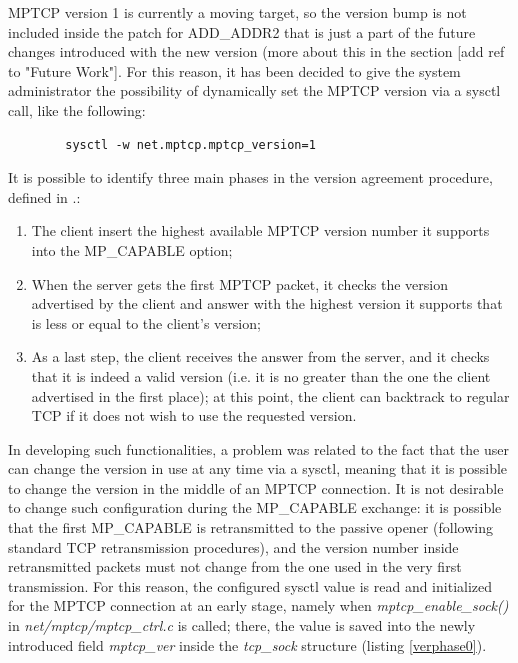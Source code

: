 MPTCP version 1 is currently a moving target, so the version bump is not included inside the patch for ADD\_ADDR2 that is just a part of the future changes introduced with the new version (more about this in the section [add ref to "Future Work"]. For this reason, it has been decided to give the system administrator the possibility of dynamically set the MPTCP version via a sysctl call, like the following:

\begin{verbatim}
        sysctl -w net.mptcp.mptcp_version=1
\end{verbatim}

It is possible to identify three main phases in the version agreement procedure, defined in .:

\begin{enumerate}
  \item The client insert the highest available MPTCP version number it supports into the MP\_CAPABLE option;
  \item When the server gets the first MPTCP packet, it checks the version advertised by the client and answer with the highest version it supports that is less or equal to the client's version;
  \item As a last step, the client receives the answer from the server, and it checks that it is indeed a valid version (i.e. it is no greater than the one the client advertised in the first place); at this point, the client can backtrack to regular TCP if it does not wish to use the requested version.
\end{enumerate}

In developing such functionalities, a problem was related to the fact that the user can change the version in use at any time via a sysctl, meaning that it is possible to change the version in the middle of an MPTCP connection. It is not desirable to change such configuration during the MP\_CAPABLE exchange: it is possible that the first MP\_CAPABLE is retransmitted to the passive opener (following standard TCP retransmission procedures), and the version number inside retransmitted packets must not change from the one used in the very first transmission. For this reason, the configured sysctl value is read and initialized for the MPTCP connection at an early stage, namely when \textit{mptcp\_enable\_sock()} in \textit{net/mptcp/mptcp\_ctrl.c} is called; there, the value is saved into the newly introduced field \textit{mptcp\_ver} inside the \textit{tcp\_sock} structure (listing \ref{verphase0}).

